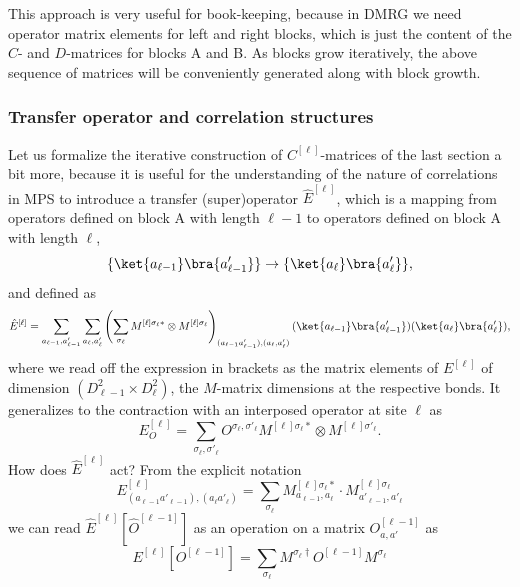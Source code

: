 This approach is very useful for book-keeping, because in DMRG we need operator matrix elements for left and right blocks, which is just the content of the $C$- and $D$-matrices for blocks A and B. As blocks grow iteratively, the above sequence of matrices will be conveniently generated along with block growth. 

\subsubsection{Transfer operator and correlation structures}
\label{subsubsec:transferoperator}
Let us formalize the iterative construction of $C^{[\ell]}$-matrices of the last section a bit more, because it is useful for the understanding of the nature of correlations in MPS to introduce a transfer (super)operator $\hat{E}^{[\ell]}$,  which is a mapping from operators defined on block A with length $\ell-1$ to operators defined on block A with length $\ell$,
\begin{equation}
\{ \ket{a_{\ell-1}} \bra{a'_{\ell-1}} \} \rightarrow \{ \ket{a_{\ell}} \bra{a'_{\ell}} \}, 
\end{equation}
and defined as
\begin{equation}
\hat{E}^{[\ell]} = \sum_{a_{\ell-1},a'_{\ell-1}} \sum_{a_\ell,a'_\ell} \left( \sum_{\sigma_\ell} M^{[\ell]\sigma_\ell *} \otimes M^{[\ell]\sigma_\ell} \right)_{(a_{\ell-1}a'_{\ell-1}),(a_\ell,a'_\ell)} (\ket{a_{\ell-1}} \bra{a'_{\ell-1}}) (\ket{a_{\ell}} \bra{a'_{\ell}}),
\end{equation}
where we read off the expression in brackets as the matrix elements of $E^{[\ell]}$ of dimension $(D^2_{\ell-1} \times D^2_{\ell})$, the $M$-matrix dimensions at the respective bonds. It generalizes to the contraction with an interposed operator at site $\ell$ as
\begin{equation}
E^{[\ell]}_O = \sum_{\sigma_\ell,\sigma'_\ell} O^{\sigma_\ell,\sigma'_\ell} M^{[\ell]\sigma_\ell *} \otimes M^{[\ell]\sigma'_\ell} .
\end{equation}
How does $\hat{E}^{[\ell]} $ act? From the explicit notation
\begin{equation}
E^{[\ell]}_{(a_{\ell-1}a'_{\ell-1}),(a_{\ell}a'_{\ell})} = \sum_{\sigma_\ell} M^{[\ell]\sigma_\ell *}_{a_{\ell-1},a_\ell} \cdot M^{[\ell]\sigma_\ell}_{a'_{\ell-1},a'_\ell}
\end{equation}
we can read $\hat{E}^{[\ell]}[ \hat{O}^{[\ell-1]}]$ as an operation on a matrix $O^{[\ell-1]}_{a,a'}$ as 
\begin{equation}
E^{[\ell]} [O^{[\ell-1]}]  = \sum_{\sigma_\ell} M^{\sigma_\ell\dagger} O^{[\ell-1]} M^{\sigma_\ell}
\end{equation} 
